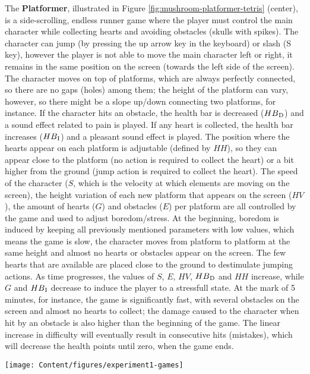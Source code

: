 The \textbf{Platformer}, illustrated in Figure \ref{fig:mushroom-platformer-tetris} (center), is a side-scrolling, endless runner game where the player must control the main character while collecting hearts and avoiding obstacles (skulls with spikes). The character can jump (by pressing the up arrow key in the keyboard) or slash (S key), however the player is not able to move the main character left or right, it remains in the same position on the screen (towards the left side of the screen). The character moves on top of platforms, which are always perfectly connected, so there are no gaps (holes) among them; the height of the platform can vary, however, so there might be a slope up/down connecting two platforms, for instance. If the character hits an obstacle, the health bar is decreased ($HB\textsubscript{D}$) and a sound effect related to pain is played. If any heart is collected, the health bar increases ($HB\textsubscript{I}$) and a pleasant sound effect is played. The position where the hearts appear on each platform is adjustable (defined by $HH$), so they can appear close to the platform (no action is required to collect the heart) or a bit higher from the ground (jump action is required to collect the heart). The speed of the character ($S$, which is the velocity at which elements are moving on the screen), the height variation of each new platform that appears on the screen ($HV$), the amount of hearts ($G$) and obstacles ($E$) per platform are all controlled by the game and used to adjust boredom/stress. At the beginning, boredom is induced by keeping all previously mentioned parameters with low values, which means the game is slow, the character moves from platform to platform at the same height and almost no hearts or obstacles appear on the screen. The few hearts that are available are placed close to the ground to destimulate jumping actions. As time progresses, the values of $S$, $E$, $HV$, $HB\textsubscript{D}$ and $HH$ increase, while $G$ and $HB\textsubscript{I}$ decrease to induce the player to a stressfull state. At the mark of 5 minutes, for instance, the game is significantly fast, with several obstacles on the screen and almost no hearts to collect; the damage caused to the character when hit by an obstacle is also higher than the beginning of the game. The linear increase in difficulty will eventually result in consecutive hits (mistakes), which will decrease the health points until zero, when the game ends.

\begin{figure*}[!h]
\centering
\texttt{[image: Content/figures/experiment1-games]}
\caption{Mushroom (left), Platformer (center) and Tetris (right). In Mushroom, player has to drag and drop the correct mushrooms into the character, discarding the wrong ones into the trash. In Platformer, the player has to jump over or slide under obstacles while collecting hearts. In our version of Tetris, there are no hints about the next piece to be added to the screen}
\label{fig:mushroom-platformer-tetris}
\end{figure*}

